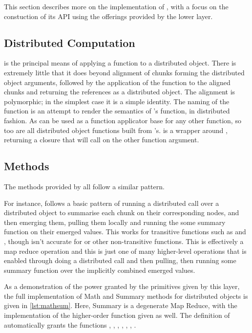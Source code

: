 This section describes more on the implementation of \lso, with a focus on the constuction of its API using the offerings provided by the lower layer.

\subsection{Distributed Computation}

 is the principal means of applying a function to a distributed object.
There is extremely little that it does beyond alignment of chunks forming the distributed object arguments, followed by the application of the function to the aligned chunks and returning the references as a distributed object.
The alignment is polymorphic; in the simplest case it is a simple identity.
The naming of the function is an attempt to render the semantics of \R's  function, in distributed fashion.
As  can be used as a function applicator base for any other function, so too are all distributed object functions built from 's.
 is a wrapper around , returning a closure that will call  on the other function argument.

\subsection{Methods}

The methods provided by \lso all follow a similar pattern.

For instance,  follows a basic pattern of running a distributed call over a distributed object to summarise each chunk on their corresponding nodes, and then emerging them, pulling them locally and running the some summary function on their  emerged values.
This works for transitive functions such as  and , though isn't accurate for  or other non-transitive functions.
This is effectively a map reduce operation and this is just one of many higher-level operations that is enabled through doing a distributed call and then pulling, then running some summary function over the implicitly combined emerged values.

As a demonstration of the power granted by the primitives given by this layer, the full implementation of Math and Summary methods for distributed objects is given in \cref{lst:mathsum}.
Here, Summary is a degenerate Map Reduce, with the implementation of the higher-order  function given as well. The definition of  automatically grants the functions , , , , , , . 

